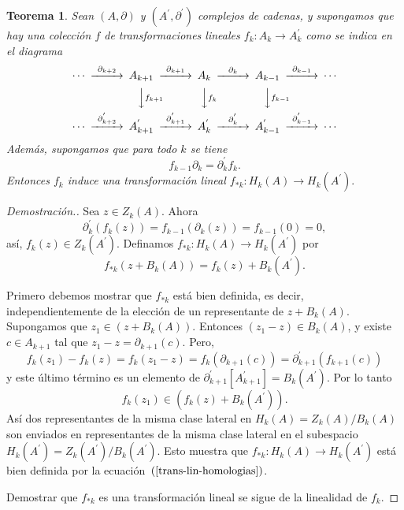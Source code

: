 \documentclass[12pt]{book}
\newtheorem{theorem}{Teorema}[section]
\theoremstyle{definition}
\newtheorem{definition}[theorem]{Definición}
\newcounter{in}
\newcounter{ini}
\begin{document}

\begin{theorem}
  Sean $(A,\partial)$ y $(A^{'},\partial^{'})$ complejos de cadenas, y
  supongamos que hay una colección $f$ de transformaciones lineales
  $f_{k}:A_{k}\rightarrow A^{'}_{k}$ como se indica en el diagrama  
  \[
  \begin{CD}
    \cdots @>{\partial_{k+2}}>> A_{k+1} @>{\partial_{k+1}}>> A_{k} @>{\partial_{k}}>> A_{k-1} @>{\partial_{k-1}}>> \cdots\\
    @.   @VVf_{k+1}V   @VVf_{k}V   @VVf_{k-1}V    \\
    \cdots @>{\partial^{'}_{k+2}}>> A^{'}_{k+1} @>{\partial^{'}_{k+1}}>> A^{'}_{k} @>{\partial^{'}_{k}}>> A^{'}_{k-1} @>{\partial^{'}_{k-1}}>> \cdots
  \end{CD}
  \]
  Además, supongamos que para todo $k$ se tiene
  $$f_{k-1}\partial_{k}=\partial^{'}_{k}f_{k}.$$
  Entonces $f_{k}$ induce una transformación lineal
  $f_{*k}:H_{k}(A)\rightarrow H_{k}(A^{'}).$
\end{theorem}
\begin{proof}[Demostración.]
  Sea $z\in Z_{k}(A)$. Ahora
  \begin{equation*}
    \partial^{'}_{k}(f_{k}(z))=f_{k-1}(\partial_{k}(z))=f_{k-1}(0)=0,
  \end{equation*}
  así, $f_{k}(z)\in Z_{k}(A^{'})$. Definamos
  $f_{*k}:H_{k}(A)\rightarrow H_{k}(A^{'})$ por
  \begin{equation}
    \label{trans-lin-homologias}
    f_{*k}(z+B_{k}(A))=f_{k}(z)+B_{k}(A^{'}).
  \end{equation}
  
  Primero debemos mostrar que $f_{*k}$ está bien definida, es decir,
  independientemente de la elección de un representante de
  $z+B_{k}(A).$ Supongamos que $z_{1}\in (z+B_{k}(A)).$ Entonces
  $(z_{1}-z)\in B_{k}(A)$, y existe $c\in A_{k+1}$ tal que
  $z_{1}-z=\partial_{k+1}(c).$ Pero,
  $$f_{k}(z_{1})-f_{k}(z)=f_{k}(z_{1}-z)=f_{k}(\partial_{k+1}(c))=\partial^{'}_{k+1}(f_{k+1}(c))$$
  y este último término es un elemento de
  $\partial^{'}_{k+1}[A^{'}_{k+1}]=B_{k}(A^{'}).$ Por lo tanto
  $$f_{k}(z_{1})\in (f_{k}(z)+B_{k}(A^{'})).$$
  Así dos representantes de la misma clase lateral en
  $H_{k}(A)=Z_{k}(A)/B_{k}(A)$ son enviados en representantes de la misma
  clase lateral en el subespacio $H_{k}(A^{'})=Z_{k}(A^{'})/B_{k}(A^{'})$. Esto muestra
  que $f_{*k}:H_{k}(A)\rightarrow H_{k}(A^{'})$ está bien definida por
  la ecuación~$(\ref{trans-lin-homologias})$.
  
  Demostrar que $f_{*k}$ es una transformación lineal se sigue de la
  linealidad de $f_{k}$.
\end{proof}
\end{document}
